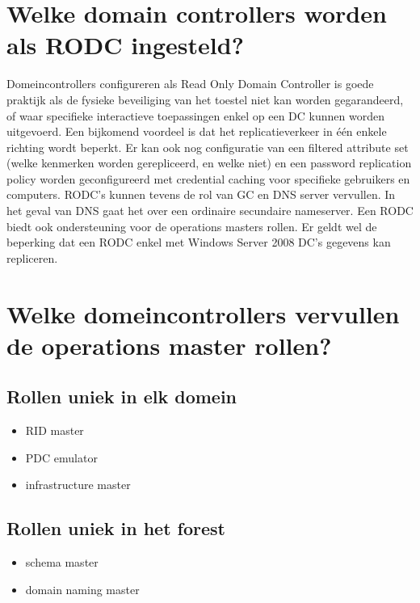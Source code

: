 \section{Welke domain controllers worden als RODC ingesteld?}

Domeincontrollers configureren als Read Only Domain Controller is goede praktijk
als de fysieke beveiliging van het toestel niet kan worden gegarandeerd, of waar
specifieke interactieve toepassingen enkel op een DC kunnen worden uitgevoerd.
Een bijkomend voordeel is dat het replicatieverkeer in één enkele richting
wordt beperkt. Er kan ook nog configuratie van een filtered attribute set (welke
kenmerken worden gerepliceerd, en welke niet) en een password replication policy
worden geconfigureerd met credential caching voor specifieke gebruikers en
computers. RODC's kunnen tevens de rol van GC en DNS server vervullen. In het
geval van DNS gaat het over een ordinaire secundaire nameserver. Een RODC biedt
ook ondersteuning voor de operations masters rollen. Er geldt wel de beperking
dat een RODC enkel met Windows Server 2008 DC's gegevens kan repliceren.

\section{Welke domeincontrollers vervullen de operations master rollen?}

\subsection{Rollen uniek in elk domein}
\begin{itemize}
	\item RID master
	\item PDC emulator
	\item infrastructure master
\end{itemize}

\subsection{Rollen uniek in het forest}
\begin{itemize}
	\item schema master
	\item domain naming master
\end{itemize}
